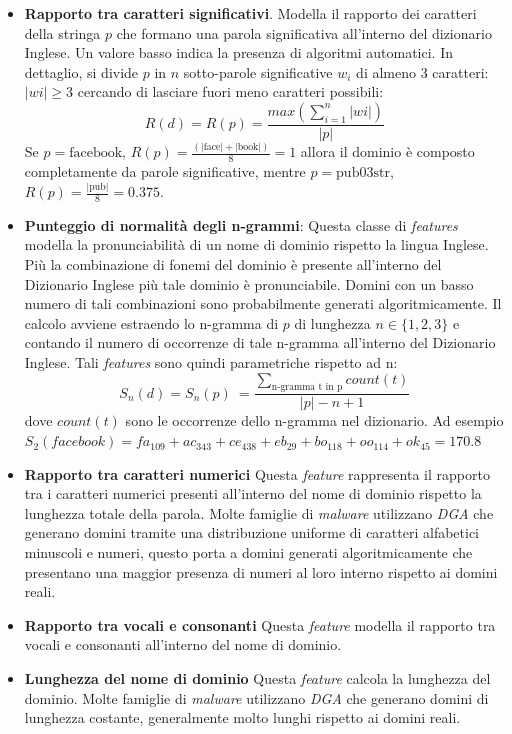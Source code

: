 \begin{itemize}

\item \textbf{Rapporto tra caratteri significativi}. Modella il rapporto dei caratteri della stringa $p$ che formano una parola significativa all'interno del dizionario Inglese. Un valore basso indica la presenza di algoritmi automatici. In dettaglio, si divide $p$ in $n$ sotto-parole significative $w_i$ di almeno $3$ caratteri: $|wi| \ge 3$ cercando di lasciare fuori meno caratteri possibili: $$R(d) = R(p) = \frac{max(\sum_{i=1}^n |wi|)}{\left | p \right |}$$ 
Se $p = \text{facebook}$, $R(p) = \frac{(|\text{face}| + |\text{book}|)}{8} = 1$ allora il dominio è composto completamente da parole significative, mentre $p = \text{pub03str}$, $R(p) = \frac{|\text{pub}|}{8} = 0.375$. 

    

\item \textbf{Punteggio di normalità degli n-grammi}: Questa classe di \textit{features} modella la pronunciabilità di un nome di dominio rispetto la lingua Inglese. Più la combinazione di fonemi del dominio è presente  all'interno del Dizionario Inglese più tale dominio è pronunciabile. Domini con un basso numero di tali combinazioni sono probabilmente generati algoritmicamente. Il calcolo avviene estraendo lo n-gramma di $p$ di lunghezza $n \in \{1, 2, 3 \}$ e contando il numero di occorrenze di tale n-gramma all'interno del Dizionario Inglese. Tali \textit{features} sono quindi parametriche rispetto ad n: 
$$S_n(d) = S_n(p) \:= \frac{\sum_{\text{n-gramma t in p}} count(t)}{\left | p \right | - n + 1}$$ 
dove $count(t)$ sono le occorrenze dello n-gramma nel dizionario. Ad esempio $S_2(facebook) = fa_{109} + ac_{343} + ce_{438} + eb_{29} + bo_{118} + oo_{114} + ok_{45} = 170.8$

       
\item \textbf{Rapporto tra caratteri numerici} Questa \textit{feature} rappresenta il rapporto tra i caratteri numerici presenti all'interno del nome di dominio rispetto la lunghezza totale della parola. Molte famiglie di \textit{malware} utilizzano \textit{DGA} che generano domini tramite una distribuzione uniforme di caratteri alfabetici minuscoli e numeri, questo porta a domini generati algoritmicamente che presentano una maggior presenza di numeri al loro interno rispetto ai domini reali.


\item \textbf{Rapporto tra vocali e consonanti} Questa \textit{feature} modella il rapporto tra vocali e consonanti all'interno del nome di dominio.


\item \textbf{Lunghezza del nome di dominio} Questa \textit{feature} calcola la lunghezza del dominio. Molte famiglie di \textit{malware} utilizzano \textit{DGA} che generano domini di lunghezza costante, generalmente molto lunghi rispetto ai domini reali.
	
\end{itemize}

